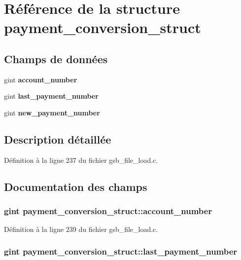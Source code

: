 \section{Référence de la structure payment\_\-conversion\_\-struct}
\label{structpayment__conversion__struct}
\subsection*{Champs de données}
\begin{DoxyCompactItemize}
\item 
gint {\bf account\_\-number}
\item 
gint {\bf last\_\-payment\_\-number}
\item 
gint {\bf new\_\-payment\_\-number}
\end{DoxyCompactItemize}


\subsection{Description détaillée}


Définition à la ligne 237 du fichier gsb\_\-file\_\-load.c.



\subsection{Documentation des champs}
\subsubsection[{account\_\-number}]{\setlength{\rightskip}{0pt plus 5cm}gint {\bf payment\_\-conversion\_\-struct::account\_\-number}}\label{structpayment__conversion__struct_a034fa565118dbca51b6399f24e102853}


Définition à la ligne 239 du fichier gsb\_\-file\_\-load.c.

\subsubsection[{last\_\-payment\_\-number}]{\setlength{\rightskip}{0pt plus 5cm}gint {\bf payment\_\-conversion\_\-struct::last\_\-payment\_\-number}}\label{structpayment__conversion__struct_ab4250cc8eeb45027d4a4166f2ad4ddbe}



